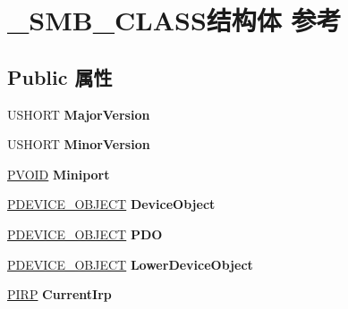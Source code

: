 \hypertarget{struct___s_m_b___c_l_a_s_s}{}\section{\+\_\+\+S\+M\+B\+\_\+\+C\+L\+A\+S\+S结构体 参考}
\label{struct___s_m_b___c_l_a_s_s}
\subsection*{Public 属性}
\begin{DoxyCompactItemize}
\item 
\mbox{\label{struct___s_m_b___c_l_a_s_s_ab119ebbfe00397b6bde4ec4678619e3e}} 
U\+S\+H\+O\+RT {\bfseries Major\+Version}
\item 
\mbox{\label{struct___s_m_b___c_l_a_s_s_a175f8f4da6ebb9eaf87e413d4adccad3}} 
U\+S\+H\+O\+RT {\bfseries Minor\+Version}
\item 
\mbox{\label{struct___s_m_b___c_l_a_s_s_adfdbc5fe09a5b3f7fed73b2cdc45435d}} 
\hyperlink{interfacevoid}{P\+V\+O\+ID} {\bfseries Miniport}
\item 
\mbox{\label{struct___s_m_b___c_l_a_s_s_a47474c35a41bb224e13d23ace89871ad}} 
\hyperlink{struct___d_e_v_i_c_e___o_b_j_e_c_t}{P\+D\+E\+V\+I\+C\+E\+\_\+\+O\+B\+J\+E\+CT} {\bfseries Device\+Object}
\item 
\mbox{\label{struct___s_m_b___c_l_a_s_s_ac99c8790e47070181e3e0e488d2751e0}} 
\hyperlink{struct___d_e_v_i_c_e___o_b_j_e_c_t}{P\+D\+E\+V\+I\+C\+E\+\_\+\+O\+B\+J\+E\+CT} {\bfseries P\+DO}
\item 
\mbox{\label{struct___s_m_b___c_l_a_s_s_a2372555bf7d2d36143a41fac4c70c2d9}} 
\hyperlink{struct___d_e_v_i_c_e___o_b_j_e_c_t}{P\+D\+E\+V\+I\+C\+E\+\_\+\+O\+B\+J\+E\+CT} {\bfseries Lower\+Device\+Object}
\item 
\mbox{\label{struct___s_m_b___c_l_a_s_s_a614950ae721625f9eac4f2825c504313}} 
\hyperlink{interfacevoid}{P\+I\+RP} {\bfseries Current\+Irp}
\item 

\end{DoxyCompactItemize}
